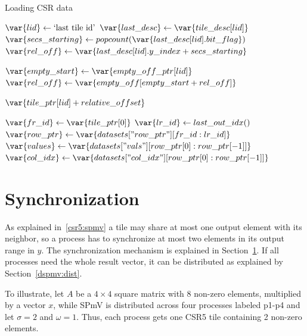 \documentclass[thesis=M,english]{FITthesis}[2019/12/23]
\begin{document}
\begin{algorithm}
    \caption{Loading CSR data}
    \begin{algorithmic}
        \State \(\var{lid} \gets \text{`last tile id'}\)
        \State \(\var{last\_desc} \gets \var{tile\_desc[lid]}\)
        \State \(\var{secs\_starting} \gets popcount(\var{last\_desc[lid].bit\_flag})\)
        \State \(\var{rel\_off} \gets \var{last\_desc[lid].y\_index + secs\_starting}\)

        \State \(\var{empty\_start} \gets \var{empty\_off\_ptr[lid]}\)
        \State \(\var{rel\_off} \gets \var{empty\_off[empty\_start + rel\_off]}\)
        \EndIf

        \Return \(\var{tile\_ptr[lid] + relative\_offset}\)
        \EndFunction

        \State \(\var{fr\_id} \gets \var{tile\_ptr[0]}\)
        \State \(\var{lr\_id} \gets last\_out\_idx()\)
        \State \(\var{row\_ptr} \gets \var{datasets["row\_ptr"][fr\_id:lr\_id]}\)
        \State \(\var{values} \gets \var{datasets["vals"][row\_ptr[0]: row\_ptr[-1]]}\)
        \State \(\var{col\_idx} \gets \var{datasets["col\_idx"][row\_ptr[0]: row\_ptr[-1]]}\)
        \EndFunction
    \end{algorithmic}
\end{algorithm}

\section{Synchronization}\label{dspmv:sync}

As explained in~\ref{csr5:spmv} a tile may share at most one output element with its neighbor,
so a process has to synchronize at most two elements in its output range in \(y\). The synchronization
mechanism is explained in Section~\ref{dspmv:sync}. If all processes need the whole result vector,
it can be distributed as explained by Section~\ref{dspmv:dist}.

To illustrate, let \(A\) be a \(4\times4\) square matrix with 8 non-zero elements, multiplied by a vector
\(x\), while SPmV is distributed across four processes labeled p1-p4 and let \(\sigma = 2\) and \(\omega = 1\).
Thus, each process gets one CSR5 tile containing 2 non-zero elements.
\end{document}
